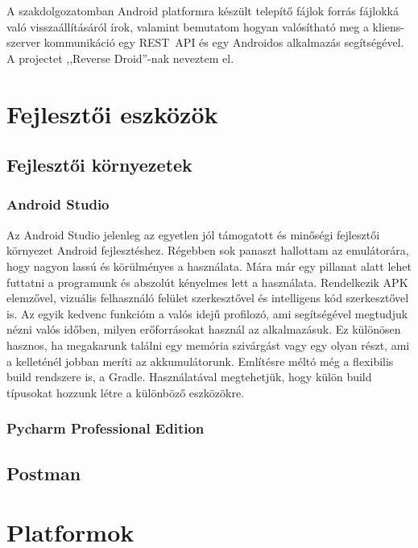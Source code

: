 \documentclass{thesis-ekf}
\theoremstyle{definition}
\theoremstyle{remark}
\begin{document}
A szakdolgozatomban Android platformra készült telepítő fájlok forrás fájlokká való visszaállításáról írok, valamint bemutatom hogyan valósítható meg a kliens-szerver kommunikáció egy REST~API és egy Androidos alkalmazás segítségével.
A projectet ,,Reverse Droid''-nak neveztem el.

\chapter{Fejlesztői eszközök}\label{eszkozok}

\section{Fejlesztői környezetek}

\subsection{Android Studio}

Az Android Studio jelenleg az egyetlen jól támogatott és minőségi fejlesztői környezet Android fejlesztéshez.
Régebben sok panaszt hallottam az emulátorára, hogy nagyon lassú és körülményes a használata.
Mára már egy pillanat alatt lehet futtatni a programunk és abszolút kényelmes lett a használata.
Rendelkezik APK elemzővel, vizuális felhasználó felület szerkesztővel és intelligens kód szerkesztővel is.
Az egyik kedvenc funkcióm a valós idejű profilozó, ami segítségével megtudjuk nézni valós időben, milyen erőforrásokat használ az alkalmazásuk.
Ez különösen hasznos, ha megakarunk találni egy memória szivárgást vagy egy olyan részt, ami a kelleténél jobban meríti az akkumulátorunk.
Említésre méltó még a flexibilis build rendszere is, a Gradle. Használatával megtehetjük, hogy külön build típusokat hozzunk létre a különböző eszközökre. \cite{androidstudio}

\subsection{Pycharm Professional Edition}

\section{Postman}

\chapter{Platformok}\label{platformok}
\end{document}
